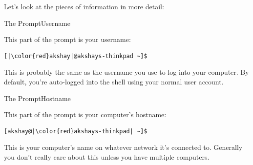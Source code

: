 Let's look at the pieces of information in more detail:

\begin{frame}[fragile]{The Prompt}{Username}
  \begin{example}
    This part of the prompt is your username:
    \begin{verbatim}
[|\color{red}akshay|@akshays-thinkpad ~]$ 
    \end{verbatim}
  \end{example}

  This is probably the same as the username you use to log into your computer.
  By default, you're auto-logged into the shell using your normal user account.
\end{frame}

\begin{frame}[fragile]{The Prompt}{Hostname}
  \begin{example}
    This part of the prompt is your computer's hostname:
    \begin{verbatim}
[akshay@|\color{red}akshays-thinkpad| ~]$ 
    \end{verbatim}
  \end{example}


  This is your computer's name on whatever network it's connected to.
  Generally you don't really care about this unless you have multiple
  computers.
\end{frame}

